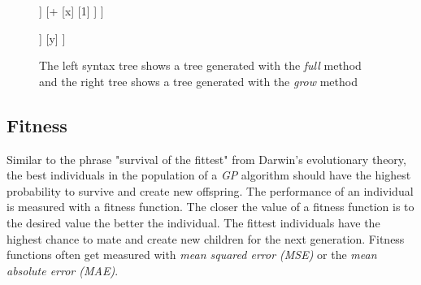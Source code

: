 \documentclass[tikz, runningheads]{llncs}
\begin{document}
\begin{figure}[h]
	\centering
	\begin{adjustbox}{valign=t}
		\begin{forest}
			[*
				[-
					[1]
					[y]
				]	
				[+
					[x]
					[1]
				]
			]
		\end{forest}
	\end{adjustbox}\qquad
	\begin{adjustbox}{valign=t}
		\begin{forest}
			[+
				[-
					[x]
					[5]
				]
				[y]	
			]
		\end{forest}
	\end{adjustbox}
	\caption{The left syntax tree shows a tree generated with the \textit{full} method and the right tree shows a tree
	generated with the \textit{grow} method} \label{fullAndGrow}
\end{figure}
 

\subsection{Fitness}
Similar to the phrase "survival of the fittest" from Darwin's evolutionary theory, the best individuals in 
the population of a \textit{GP} algorithm should have the highest probability to survive and create new offspring. 
The performance of an individual is measured with a fitness function. 
The closer the value of a fitness function is to the desired value the better the individual. 
The fittest individuals have the highest chance to mate and create new children for the next generation.  
Fitness functions often get measured with \textit{mean squared error (MSE)} or the \textit{mean absolute error (MAE)}. 
\end{document}
